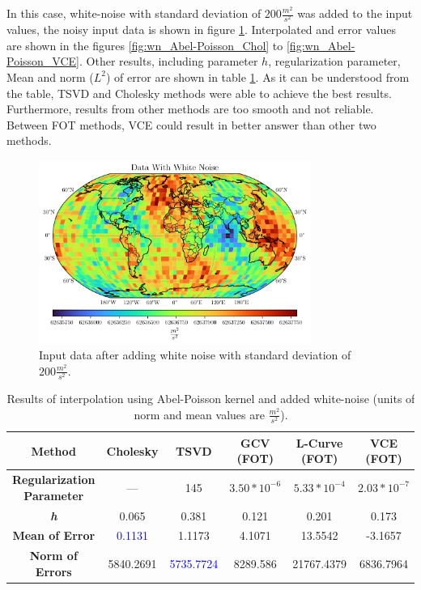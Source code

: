 \documentclass[12pt]{article}
\begin{document}
	In this case, white-noise with standard deviation of $200 \frac{m^2}{s^2}$ was added to the input values, the noisy input data is shown in figure \ref{fig:DataWithNoise}. Interpolated and error values are shown in the figures \ref{fig:wn_Abel-Poisson_Chol} to \ref{fig:wn_Abel-Poisson_VCE}. Other results, including parameter $h$, regularization parameter, Mean and norm ($L^2$) of error are shown in table \ref{tab:wn_Abel-Poisson_Results}. As it can be understood from the table, TSVD and Cholesky methods were able to achieve the best results. Furthermore, results from other methods are too smooth and not reliable. 
	Between FOT methods, VCE could result in better answer than other two methods.
	
	\begin{figure}[h!]
		\centering
		\includegraphics[height=6cm]{../Outputs/Plots/DataWithNoise.pdf}
		\caption{Input data after adding white noise with standard deviation of $200 \frac{m^2}{s^2}$.}
		\label{fig:DataWithNoise}
	\end{figure}
	
	\begin{table}[h!]
		\centering
		\caption{Results of interpolation using Abel-Poisson kernel and added white-noise (units of norm and mean values are $\frac{m^2}{s^2}$).}
		\vspace{0.2cm}
		\renewcommand{\arraystretch}{2}
		\begin{tabular}{c|c|c|c|c|c}
			\textbf{Method} & Cholesky & TSVD & GCV (FOT) & L-Curve (FOT) & VCE (FOT) \\
			\hline 
			\makecell{\textbf{Regularization} \\ \textbf{Parameter}} & --- & 145 & $3.50*10^{-6}$ & $5.33*10^{-4}$ & $2.03*10^{-7}$ \\
			\hline 
			\textit{\textbf{h}} & 0.065 & 0.381 & 0.121 & 0.201 & 0.173 \\
			\hline
			\textbf{Mean of Error} & \textcolor{blue}{0.1131} & 1.1173 & 4.1071 & 13.5542 & -3.1657 \\
			\hline 
			\textbf{Norm of Errors} & 5840.2691 & \textcolor{blue}{5735.7724} & 8289.586 & 21767.4379 & 6836.7964 \\
		\end{tabular}
		\label{tab:wn_Abel-Poisson_Results}
	\end{table}
	
\end{document}
